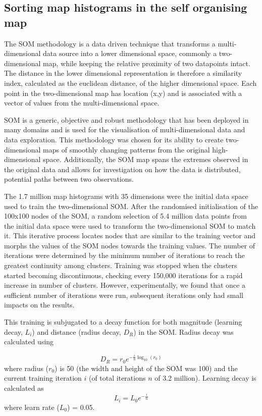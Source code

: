 \documentclass[9pt,twocolumn,twoside,lineno]{pnas-new}
\begin{document}
{\subsection*{Sorting map histograms in the self organising map}\label{methodscluster}
The SOM methodology\cite{Kohonen1982} is a data driven technique that transforms a multi-dimensional data source into a lower dimensional space, commonly a two-dimensional map, while keeping the relative proximity of two datapoints intact. The distance in the lower dimensional representation is therefore a similarity index, calculated as the euclidean distance, of the higher dimensional space. Each point in the two-dimensional map has location (x,y) and is associated with a vector of values from the multi-dimensional space.

SOM is a generic, objective and robust methodology that has been deployed in many domains and is used for the visualisation of multi-dimensional data and data exploration\cite{Koleheimen2004}. This methodology was chosen for its ability to create two-dimensional maps of smoothly changing patterns from the original high-dimensional space. Additionally, the SOM map spans the extremes observed in the original data and allows for investigation on how the data is distributed, potential paths between two observations. 

The 1.7 million map histograms with 35 dimensions were the initial data space used to train the two-dimensional SOM. After the randomised initialisation of the 100x100 nodes of the SOM, a random selection of 5.4 million data points from the initial data space were used to transform the two-dimensional SOM to match it. This iterative process locates nodes that are similar to the training vector and morphs the values of the SOM nodes towards the training values. The number of iterations were determined by the minimum number of iterations to reach the greatest continuity among clusters. Training was stopped when the clusters started becoming discontinuous, checking every 150,000 iterations for a rapid increase in number of clusters. However, experimentally, we found that once a sufficient number of iterations were run, subsequent iterations only had small impacts on the results. 

This training is subjugated to a decay function for both magnitude (learning decay, $L_{i}$) and distance (radius decay, $D_{R}$) in the SOM. Radius decay was calculated using

\begin{equation} 
D_{R} = r_{0} e^{-\frac{i}{n} \log _{10} (r_{0})}
\end{equation}
where radius ($r_{0}$) is 50 (the width and height of the SOM was 100) and the current training iteration $i$ (of total iterations $n$ of 3.2 million). Learning decay is calculated as
\begin{equation} 
L_{i} = L_{0} e^{-\frac{i}{n}}
\end{equation}
where learn rate ($L_{0}$) = 0.05.

}
\end{document}
